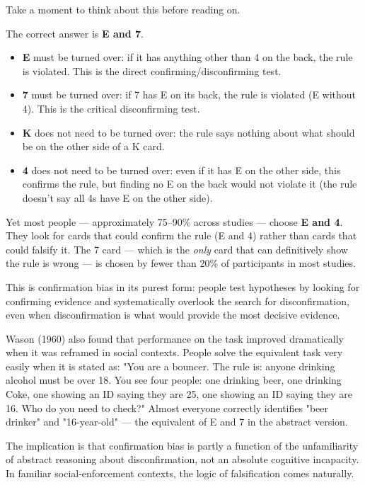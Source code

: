 \documentclass[12pt, letterpaper]{article}
\begin{document}
Take a moment to think about this before reading on.

The correct answer is \textbf{E and 7}.

\begin{itemize}
\item \textbf{E} must be turned over: if it has anything other than 4 on the back, the rule is violated. This is the direct confirming/disconfirming test.
\item \textbf{7} must be turned over: if 7 has E on its back, the rule is violated (E without 4). This is the critical disconfirming test.
\item \textbf{K} does not need to be turned over: the rule says nothing about what should be on the other side of a K card.
\item \textbf{4} does not need to be turned over: even if it has E on the other side, this confirms the rule, but finding no E on the back would not violate it (the rule doesn't say all 4s have E on the other side).
\end{itemize}

Yet most people --- approximately 75--90\% across studies --- choose \textbf{E and 4}. They look for cards that could confirm the rule (E and 4) rather than cards that could falsify it. The 7 card --- which is the \textit{only} card that can definitively show the rule is wrong --- is chosen by fewer than 20\% of participants in most studies.

This is confirmation bias in its purest form: people test hypotheses by looking for confirming evidence and systematically overlook the search for disconfirmation, even when disconfirmation is what would provide the most decisive evidence.

Wason (1960) also found that performance on the task improved dramatically when it was reframed in social contexts. People solve the equivalent task very easily when it is stated as: "You are a bouncer. The rule is: anyone drinking alcohol must be over 18. You see four people: one drinking beer, one drinking Coke, one showing an ID saying they are 25, one showing an ID saying they are 16. Who do you need to check?" Almost everyone correctly identifies "beer drinker" and "16-year-old" --- the equivalent of E and 7 in the abstract version.

The implication is that confirmation bias is partly a function of the unfamiliarity of abstract reasoning about disconfirmation, not an absolute cognitive incapacity. In familiar social-enforcement contexts, the logic of falsification comes naturally.
\end{document}
